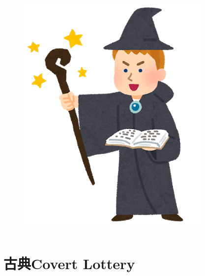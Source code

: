 \begin{frame}
\begin{columns}
\begin{column}{0.5\textwidth}
      \begin{figure}[h]
        \includegraphics[height=0.35\textheight]{img/bob.png}
      \end{figure}
    \end{column}
  \end{columns}
\end{frame}

\section{古典Covert Lottery}

